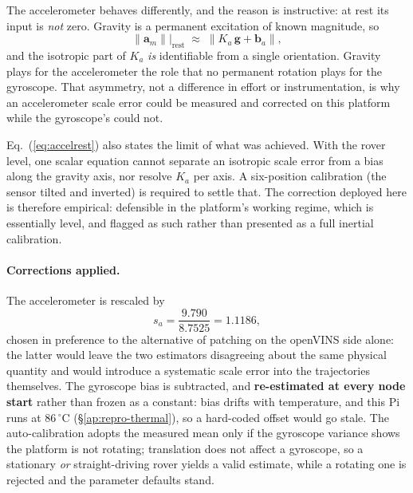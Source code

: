 The accelerometer behaves differently, and the reason is instructive: at rest
its input is \emph{not} zero. Gravity is a permanent excitation of known
magnitude, so
\begin{equation}
\bigl\lVert \mathbf{a}_m \bigr\rVert\Big|_{\text{rest}}
  \;\approx\; \bigl\lVert K_a\,\mathbf{g} + \mathbf{b}_a \bigr\rVert ,
\label{eq:accelrest}
\end{equation}
and the isotropic part of $K_a$ \emph{is} identifiable from a single
orientation. Gravity plays for the accelerometer the role that no permanent
rotation plays for the gyroscope. That asymmetry, not a difference in effort
or instrumentation, is why an accelerometer scale error could be measured
and corrected on this platform while the gyroscope's could not.

Eq.~(\ref{eq:accelrest}) also states the limit of what was achieved. With the
rover level, one scalar equation cannot separate an isotropic scale error from
a bias along the gravity axis, nor resolve $K_a$ per axis. A six-position
calibration (the sensor tilted and inverted) is required to settle that. The
correction deployed here is therefore empirical: defensible in the platform's
working regime, which is essentially level, and flagged as such rather than
presented as a full inertial calibration.

\paragraph{Corrections applied.} The accelerometer is rescaled by
\begin{equation}
s_a = \frac{9.790}{8.7525} = 1.1186 ,
\label{eq:accelscale}
\end{equation}
chosen in preference to the alternative of patching  on the
openVINS side alone: the latter would leave the two estimators disagreeing
about the same physical quantity and would introduce a systematic scale error
into the trajectories themselves. The gyroscope bias is subtracted, and
\textbf{re-estimated at every node start} rather than frozen as a constant:
bias drifts with temperature, and this Pi runs at $86\,^\circ$C
(\S\ref{ap:repro-thermal}), so a hard-coded offset would go stale. The
auto-calibration adopts the measured mean only if the gyroscope variance shows
the platform is not rotating; translation does not affect a gyroscope, so a
stationary \emph{or} straight-driving rover yields a valid estimate, while a
rotating one is rejected and the parameter defaults stand.

